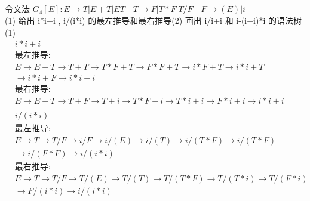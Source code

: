 \documentclass{article}
\begin{document}
\subsection{}%
\noindent
令文法 $G_4[E]:E \rightarrow T | E+T | E T
      \quad T \rightarrow F |T*F | T/F
      \quad F \rightarrow(E) | i$ \\
(1) 给出 i*i+i , i/(i*i) 的最左推导和最右推导(2) 画出 i/i+i 和 i-(i+i)*i 的语法树 \\
(1)
\begin{align*}
       & i*i+i                                                                                                                           \\
       & \text{最左推导:}                                                                                                                \\
       & E \rightarrow E+T \rightarrow T+T \rightarrow T*F+T \rightarrow F*F+T \rightarrow i*F+T \rightarrow i*i+T                       \\
       & \rightarrow i*i+F \rightarrow i*i+i                                                                                             \\
       & \text{最右推导:}                                                                                                                \\
       & E \rightarrow E+T \rightarrow T+F \rightarrow T+i \rightarrow T*F+i \rightarrow T*i+i \rightarrow F*i+i \rightarrow i*i+i       \\
      \\
       & i/(i*i)                                                                                                                         \\
       & \text{最左推导:}                                                                                                                \\
       & E \rightarrow T \rightarrow T/F \rightarrow i/F \rightarrow i/(E) \rightarrow i/(T) \rightarrow i/(T*F) \rightarrow i/(T*F)     \\
       & \rightarrow i/(F*F) \rightarrow i/(i*i)                                                                                         \\
       & \text{最右推导:}                                                                                                                \\
       & E \rightarrow T \rightarrow T/F \rightarrow T/(E) \rightarrow T/(T) \rightarrow T/(T*F) \rightarrow T/(T*i) \rightarrow T/(F*i) \\
       & \rightarrow F/(i*i) \rightarrow i/(i*i)
\end{align*}
\end{document}
